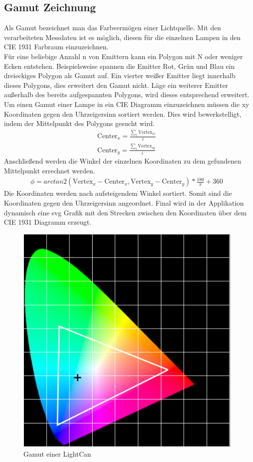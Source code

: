 \documentclass[11pt]{scrartcl}
\begin{document}
\subsection{Gamut Zeichnung}
Als Gamut bezeichnet man das Farbvermögen einer Lichtquelle. Mit den verarbeiteten Messdaten ist es möglich, diesen für die einzelnen Lampen in den CIE 1931 Farbraum einzuzeichnen.\\
Für eine beliebige Anzahl n von Emittern kann ein Polygon mit N oder weniger Ecken entstehen. Beispielsweise spannen die Emitter Rot, Grün und Blau ein
dreieckiges Polygon als Gamut auf. Ein vierter weißer Emitter liegt innerhalb dieses Polygons, dies erweitert den Gamut nicht. Läge ein weiterer Emitter außerhalb des
bereits aufgespannten Polygons, wird dieses entsprechend erweitert.\\
Um einen Gamut einer Lampe in ein CIE Diagramm einzuzeichnen müssen die xy Koordinaten gegen den Uhrzeigersinn sortiert werden. Dies wird bewerkstelligt, indem
der Mittelpunkt des Polygons gesucht wird.
\begin{align}\label{Equ:14}
    \text{Center}_x = \frac{\sum_{i}\text{Vertex}_{ix}}{i}\\
    \text{Center}_y = \frac{\sum_{i}\text{Vertex}_{iy}}{i}
\end{align}
Anschließend werden die Winkel der einzelnen Koordinaten zu dem gefundenen Mittelpunkt errechnet werden.
\begin{align}\label{Equ:15}
    \phi = arctan2(\text{Vertex}_x - \text{Center}_x, \text{Vertex}_y - \text{Center}_y)*\frac{180}{\pi}+360 %
\end{align}
Die Koordinaten werden nach aufsteigendem Winkel sortiert. Somit sind die Koordinaten gegen den Uhrzeigersinn angeordnet. Final wird in der Applikation dynamisch
eine \ac{svg} Grafik mit den Strecken zwischen den Koordinaten über dem CIE 1931 Diagramm erzeugt.\\
\begin{figure}[H]
    \begin{center}
        \includegraphics[width=.7\textwidth]{images/gamut_lightCan.png}
    \end{center}
    \caption{Gamut einer LightCan}
\end{figure}
\noindent
\end{document}

